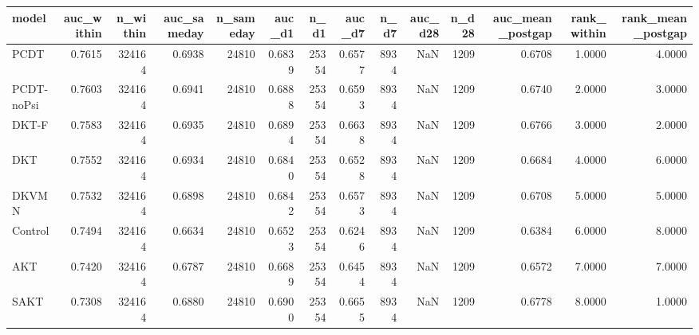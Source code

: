 \begin{tabular}{lrrrrrrrrrrrrr}
\toprule
model & auc\_within & n\_within & auc\_sameday & n\_sameday & auc\_d1 & n\_d1 & auc\_d7 & n\_d7 & auc\_d28 & n\_d28 & auc\_mean\_postgap & rank\_within & rank\_mean\_postgap \\
\midrule
PCDT & 0.7615 & 324164 & 0.6938 & 24810 & 0.6839 & 25354 & 0.6577 & 8934 & NaN & 1209 & 0.6708 & 1.0000 & 4.0000 \\
PCDT-noPsi & 0.7603 & 324164 & 0.6941 & 24810 & 0.6888 & 25354 & 0.6593 & 8934 & NaN & 1209 & 0.6740 & 2.0000 & 3.0000 \\
DKT-F & 0.7583 & 324164 & 0.6935 & 24810 & 0.6894 & 25354 & 0.6638 & 8934 & NaN & 1209 & 0.6766 & 3.0000 & 2.0000 \\
DKT & 0.7552 & 324164 & 0.6934 & 24810 & 0.6840 & 25354 & 0.6528 & 8934 & NaN & 1209 & 0.6684 & 4.0000 & 6.0000 \\
DKVMN & 0.7532 & 324164 & 0.6898 & 24810 & 0.6842 & 25354 & 0.6573 & 8934 & NaN & 1209 & 0.6708 & 5.0000 & 5.0000 \\
Control & 0.7494 & 324164 & 0.6634 & 24810 & 0.6523 & 25354 & 0.6246 & 8934 & NaN & 1209 & 0.6384 & 6.0000 & 8.0000 \\
AKT & 0.7420 & 324164 & 0.6787 & 24810 & 0.6689 & 25354 & 0.6454 & 8934 & NaN & 1209 & 0.6572 & 7.0000 & 7.0000 \\
SAKT & 0.7308 & 324164 & 0.6880 & 24810 & 0.6900 & 25354 & 0.6655 & 8934 & NaN & 1209 & 0.6778 & 8.0000 & 1.0000 \\
\bottomrule
\end{tabular}
